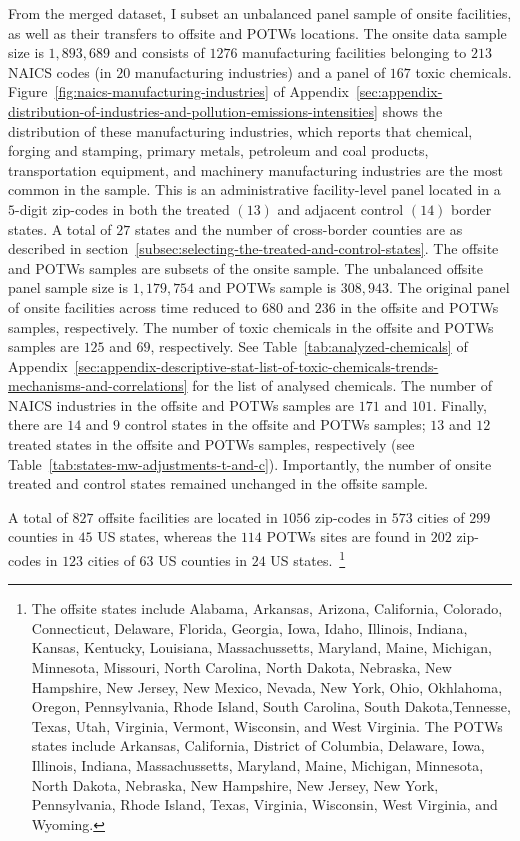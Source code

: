 \documentclass[12pt, english]{article}
\begin{document}
    From the merged dataset, I subset an unbalanced panel sample of onsite facilities, as well as their transfers to offsite and POTWs locations. The onsite data sample size is $1,893,689$ and consists of $1276$ manufacturing facilities belonging to $213$ NAICS codes (in $20$ manufacturing industries) and a panel of $167$ toxic chemicals. Figure~\ref{fig:naics-manufacturing-industries} of Appendix~\ref{sec:appendix-distribution-of-industries-and-pollution-emissions-intensities} shows the distribution of these manufacturing industries, which reports that chemical, forging and stamping, primary metals, petroleum and coal products, transportation equipment, and machinery manufacturing industries are the most common in the sample. This is an administrative facility-level panel located in a $5$-digit zip-codes in both the treated $(13)$ and adjacent control $(14)$ border states. A total of $27$ states and the number of cross-border counties are as described in section~\ref{subsec:selecting-the-treated-and-control-states}. The offsite and POTWs samples are subsets of the onsite sample. The unbalanced offsite panel sample size is $1,179,754$ and POTWs sample is $308,943$. The original panel of onsite facilities across time reduced to $680$ and $236$ in the offsite and POTWs samples, respectively. The number of toxic chemicals in the offsite and POTWs samples are $125$ and $69$, respectively. See Table~\ref{tab:analyzed-chemicals} of Appendix~\ref{sec:appendix-descriptive-stat-list-of-toxic-chemicals-trends-mechanisms-and-correlations} for the list of analysed chemicals. The number of NAICS industries in the offsite and POTWs samples are $171$ and $101$. Finally, there are $14$ and $9$ control states in the offsite and POTWs samples; $13$ and $12$ treated states in the offsite and POTWs samples, respectively (see Table~\ref{tab:states-mw-adjustments-t-and-c}). Importantly, the number of onsite treated and control states remained unchanged in the offsite sample.

    A total of $827$ offsite facilities are located in $1056$ zip-codes in $573$ cities of $299$ counties in $45$ US states, whereas the $114$ POTWs sites are found in $202$ zip-codes in $123$ cities of $63$ US counties in $24$ US states.~\footnote{\tiny The offsite states include Alabama, Arkansas, Arizona, California, Colorado, Connecticut, Delaware, Florida, Georgia, Iowa, Idaho, Illinois, Indiana, Kansas, Kentucky, Louisiana, Massachussetts, Maryland, Maine, Michigan, Minnesota, Missouri, North Carolina, North Dakota, Nebraska, New Hampshire, New Jersey, New Mexico, Nevada, New York, Ohio, Okhlahoma, Oregon, Pennsylvania, Rhode Island, South Carolina, South Dakota,Tennesse, Texas, Utah, Virginia, Vermont, Wisconsin, and West Virginia. The POTWs states include Arkansas, California, District of Columbia, Delaware, Iowa, Illinois, Indiana, Massachussetts, Maryland, Maine, Michigan, Minnesota, North Dakota, Nebraska, New Hampshire, New Jersey, New York, Pennsylvania, Rhode Island, Texas, Virginia, Wisconsin, West Virginia, and Wyoming.}
\end{document}
